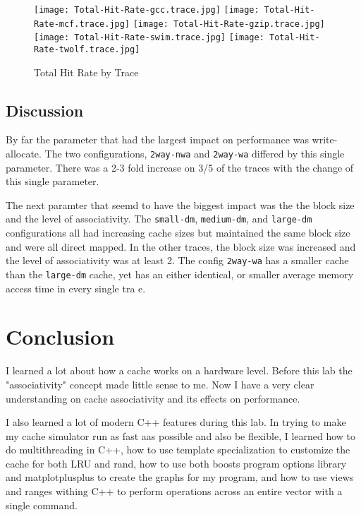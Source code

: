 \documentclass[12pt]{article}
\begin{document}
\begin{figure}[H]
  \centering
  \texttt{[image: Total-Hit-Rate-gcc.trace.jpg]}
  \texttt{[image: Total-Hit-Rate-mcf.trace.jpg]}
  \hfil
  \texttt{[image: Total-Hit-Rate-gzip.trace.jpg]}
  \texttt{[image: Total-Hit-Rate-swim.trace.jpg]}
  \hfil
  \texttt{[image: Total-Hit-Rate-twolf.trace.jpg]}
  \caption{Total Hit Rate by Trace}
\end{figure}
\subsection{Discussion}
By far the parameter that had the largest impact on performance was write-allocate. The two configurations, \verb|2way-nwa| and \verb|2way-wa| differed by this single parameter. There was a 2-3 fold increase on 3/5 of the traces with the change of this single parameter.

The next paramter that seemd to have the biggest impact was the the block size and the level of associativity. The \verb|small-dm|, \verb|medium-dm|, and \verb|large-dm| configurations all had increasing cache sizes but maintained the same block size and were all direct mapped. In the other traces, the block size was increased and the level of associativity was at least 2. The config \verb|2way-wa| has a smaller cache than the \verb|large-dm| cache, yet has an either identical, or smaller average memory access time in every single tra
e.
\section{Conclusion}
I learned a lot about how a cache works on a hardware level. Before this lab the "associativity" concept made little sense to me. Now I have a very clear understanding on cache associativity and its effects on performance. 

I also learned a lot of modern C++ features during this lab. In trying to make my cache simulator run as fast aas possible and also be flexible, I learned how to do multithreading in C++, how to use template specialization to customize the cache for both LRU and rand, how to use both boosts program options library and matplotplusplus to create the graphs for my program, and how to use views and ranges withing C++ to perform operations across an entire vector with a single command.
\end{document}
